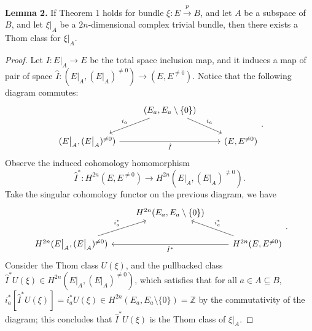 \documentclass[10pt]{article}
\begin{document}
\textbf{Lemma 2.} If Theorem 1 holds for bundle $\xi:E\overset{p}{\to} B$, and let $A$ be a subspace of $B$, and let $\xi\big|_{A}$ be a $2n$-dimensional complex trivial bundle, then there exists a Thom class for $\xi\big|_A$.
\begin{proof}
Let $I:E\big|_A\to E$ be the total space inclusion map, and it induces a map of pair of space $\hat{I}:(E\big|_A,(E\big|_A)^{\neq0})\to(E,E^{\neq0})$. Notice that the following diagram commutes:
$$
\begin{tikzcd}
                                                       & {(E_a,E_a\setminus\{0\})} \arrow[rd, "i_a"] \arrow[ld, "i_a"'] &                 \\
{(E\big|_A,(E\big|_A)^{\neq0})} \arrow[rr, "\hat{I}"'] &                                                                & {(E,E^{\neq0})}
\end{tikzcd}.
$$
Observe the induced cohomology homomorphism
$$\hat{I}^*:H^{2n}(E,E^{\neq0})\to H^{2n}(E\big|_A,(E\big|_A)^{\neq0}).$$
Take the singular cohomology functor on the previous diagram, we have
$$
\begin{tikzcd}
                                                          & {H^{2n}(E_a,E_a\setminus\{0\})} &                                                                    \\
{H^{2n}(E\big|_A,(E\big|_A)^{\neq0})} \arrow[ru, "i_a^*"] &                                 & {H^{2n}(E,E^{\neq0})} \arrow[lu, "i_a^*"'] \arrow[ll, "\hat{I}^*"]
\end{tikzcd}.
$$
Consider the Thom class $U(\xi)$, and the pullbacked class $\hat{I}^*U(\xi)\in H^{2n}(E\big|_A,(E\big|_A)^{\neq0})$, which satisfies that for all $a\in A\subseteq B$, $i_a^*[\hat{I}^*U(\xi)]=i_a^*U(\xi)\in H^{2n}(E_a,E_a\setminus\{0\})=\mathbb{Z}$ by the commutativity of the diagram; this concludes that $\hat{I}^*U(\xi)$ is the Thom class of $\xi\big|_A$.
\end{proof}
\end{document}
